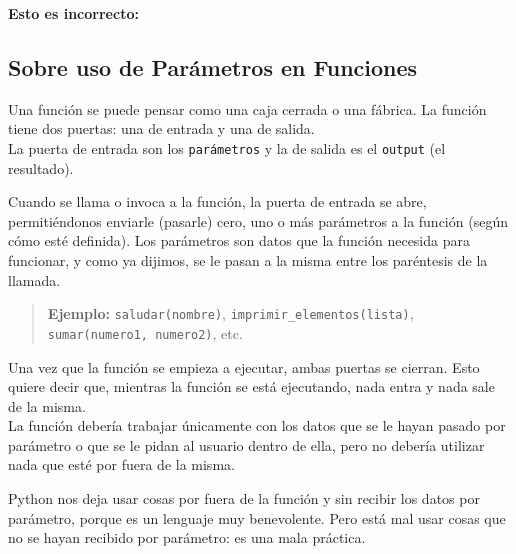 \documentclass[
  letterpaper,
  DIV=11,
  numbers=noendperiod]{scrreprt}
\begin{document}
\textbf{Esto es incorrecto:}

\subsection{Sobre uso de Parámetros en
Funciones}\label{sobre-uso-de-paruxe1metros-en-funciones}

Una función se puede pensar como una caja cerrada o una fábrica. La
función tiene dos puertas: una de entrada y una de salida.\\
La puerta de entrada son los \texttt{parámetros} y la de salida es el
\texttt{output} (el resultado).

Cuando se llama o invoca a la función, la puerta de entrada se abre,
permitiéndonos enviarle (pasarle) cero, uno o más parámetros a la
función (según cómo esté definida). Los parámetros son datos que la
función necesida para funcionar, y como ya dijimos, se le pasan a la
misma entre los paréntesis de la llamada.\\

\begin{quote}
\textbf{Ejemplo:} \texttt{saludar(nombre)},
\texttt{imprimir\_elementos(lista)}, \texttt{sumar(numero1,\ numero2)},
etc.
\end{quote}

Una vez que la función se empieza a ejecutar, ambas puertas se cierran.
Esto quiere decir que, mientras la función se está ejecutando, nada
entra y nada sale de la misma.\\
La función debería trabajar únicamente con los datos que se le hayan
pasado por parámetro o que se le pidan al usuario dentro de ella, pero
no debería utilizar nada que esté por fuera de la misma.

\begin{tcolorbox}[enhanced jigsaw, bottomrule=.15mm, leftrule=.75mm, opacityback=0, colback=white, toprule=.15mm, bottomtitle=1mm, opacitybacktitle=0.6, rightrule=.15mm, left=2mm, arc=.35mm, coltitle=black, title=\textcolor{quarto-callout-warning-color}{\faExclamationTriangle}\hspace{0.5em}{¡Cuidado!}, breakable, toptitle=1mm, colframe=quarto-callout-warning-color-frame, titlerule=0mm, colbacktitle=quarto-callout-warning-color!10!white]

Python nos deja usar cosas por fuera de la función y sin recibir los
datos por parámetro, porque es un lenguaje muy benevolente. Pero está
mal usar cosas que no se hayan recibido por parámetro: es una mala
práctica.

\end{tcolorbox}
\end{document}
